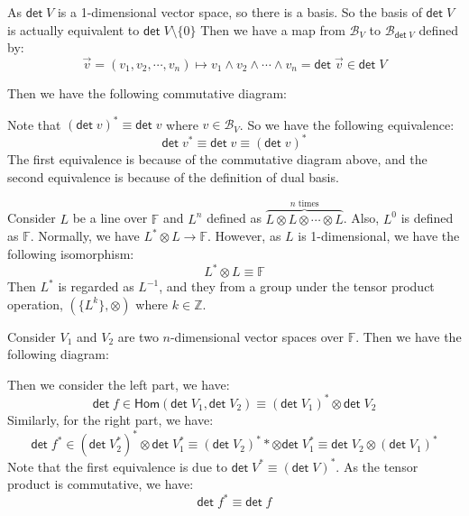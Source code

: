 \documentclass[
	11pt, %
	fleqn, %
	a4paper, %
]{LegrandOrangeBook}
\newcommand{\Hom}{\mathsf{Hom}} %
\newcommand{\F}{\mathbb{F}} %
\newcommand{\B}{\mathcal{B}} %
\newcommand{\Z}{\mathbb{Z}} %
\renewcommand{\det}{\mathsf{det\;}} %
\begin{document}
As $\det V$ is a 1-dimensional vector space, so there is a basis. So the basis of $\det V$ is actually equivalent to $\det V \setminus \{ 0 \}$ Then we have a map from $\B_V$ to $\B_{\det V}$ defined by:
\[
    \vec{v} = (v_1, v_2, \cdots, v_n) \mapsto v_1 \wedge v_2 \wedge \cdots \wedge v_n = \det \vec{v} \in \det V
\]

Then we have the following commutative diagram:
\begin{center}
\end{center}

Note that $(\det v)^* \equiv \det v$ where $v \in \B_V$. So we have the following equivalence:
\[
    \det v^* \equiv \det v \equiv (\det v)^*
\]
The first equivalence is because of the commutative diagram above, and the second equivalence is because of the definition of dual basis.

Consider $L$ be a line over $\F$ and $L^n$ defined as $\overbrace{L \otimes L \otimes \cdots \otimes L}^{n \text{ times}}$. Also, $L^0$ is defined as $\F$. Normally, we have $L^* \otimes L \to \F$. However, as $L$ is 1-dimensional, we have the following isomorphism:
\[
    L^* \otimes L \equiv \F
\]
Then $L^*$ is regarded as $L^{-1}$, and they from a group under the tensor product operation, $(\{ L^k \}, \otimes)$ where $k \in \Z$.

Consider $V_1$ and $V_2$ are two $n$-dimensional vector spaces over $\F$. Then we have the following diagram:
\begin{center}
\end{center}

Then we consider the left part, we have:
\[
    \det f \in \Hom(\det V_1, \det V_2) \equiv (\det V_1)^* \otimes \det V_2
\]
Similarly, for the right part, we have:
\[
    \det f^* \in (\det V_2^*)^* \otimes \det V_1^* \equiv (\det V_2)^** \otimes \det V_1^* \equiv \det V_2 \otimes (\det V_1)^*
\]
Note that the first equivalence is due to $\det V^* \equiv (\det V)^*$. As the tensor product is commutative, we have:
\[
    \det f^* \equiv \det f
\]
\end{document}
